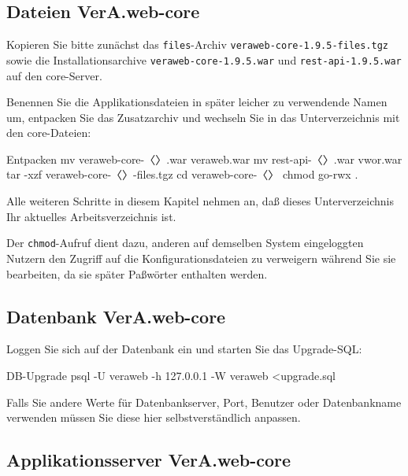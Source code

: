 \documentclass{tarentanleitung}
\newcommand{\vwiaverssw}{1.9.5}
\begin{document}
\subsection{Dateien VerA.web-core}\label{subsec:upgrade-core-files}

Kopieren Sie bitte zunächst das \texttt{files}-Archiv
\texttt{veraweb-core-\vwiaverssw{}-files.tgz} sowie die
Installationsarchive \texttt{veraweb-core-\vwiaverssw{}.war}
und \texttt{rest-api-\vwiaverssw{}.war} auf den core-Server.

\begin{minipage}{\linewidth}
Benennen Sie die Applikationsdateien in später leicher zu
verwendende Namen um, entpacken Sie das Zusatzarchiv und
wechseln Sie in das Unterverzeichnis mit den core-Dateien:

\begin{lstdump}{Entpacken}
mv veraweb-core-〈\lstdumpesc{\vwiaverssw}〉.war veraweb.war
mv rest-api-〈\lstdumpesc{\vwiaverssw}〉.war vwor.war
tar -xzf veraweb-core-〈\lstdumpesc{\vwiaverssw}〉-files.tgz
cd veraweb-core-〈\lstdumpesc{\vwiaverssw}〉
chmod go-rwx .
\end{lstdump}
\end{minipage}

Alle weiteren Schritte in diesem Kapitel nehmen an, daß dieses
Unterverzeichnis Ihr aktuelles Arbeitsverzeichnis ist.

Der \texttt{chmod}-Aufruf dient dazu, anderen auf demselben System
eingeloggten Nutzern den Zugriff auf die Konfigurationsdateien zu
verweigern während Sie sie bearbeiten, da sie später Paßwörter
enthalten werden.

\subsection{Datenbank VerA.web-core}\label{subsec:upgrade-core-db}

\begin{minipage}{\linewidth}
Loggen Sie sich auf der Datenbank ein und starten Sie das Upgrade-SQL:

\begin{lstdump}{DB-Upgrade}
psql -U veraweb -h 127.0.0.1 -W veraweb <upgrade.sql
\end{lstdump}

Falls Sie andere Werte für Datenbankserver, Port, Benutzer oder Datenbankname
verwenden müssen Sie diese hier selbstverständlich anpassen.
\end{minipage}

\subsection{Applikationsserver VerA.web-core}\label{subsec:upgrade-core-tomcat}
\end{document}

